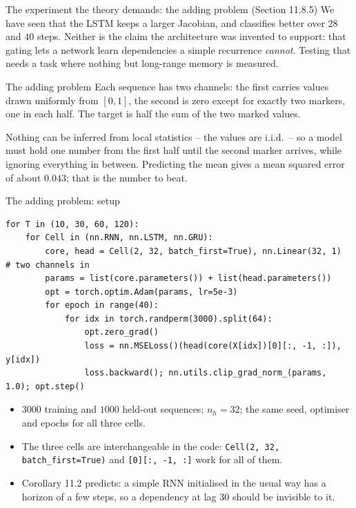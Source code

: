\documentclass[10pt,aspectratio=169]{beamer}
\begin{document}
\begin{frame}{The experiment the theory demands: the adding problem (Section 11.8.5)}
We have seen that the LSTM keeps a larger Jacobian, and classifies better
over $28$ and $40$ steps.  Neither is the claim the architecture was
invented to support: that gating lets a network learn dependencies a simple
recurrence \emph{cannot}.  Testing that needs a task where nothing but
long-range memory is measured.
\begin{block}{The adding problem}
Each sequence has two channels: the first carries values drawn uniformly
from $[0,1]$, the second is zero except for exactly two markers, one in
each half.  The target is half the sum of the two marked values.
\end{block}
Nothing can be inferred from local statistics -- the values are i.i.d.\ --
so a model must hold one number from the first half until the second marker
arrives, while ignoring everything in between.  Predicting the mean gives
a mean squared error of about $0.043$; that is the number to beat.
\end{frame}

\begin{frame}[fragile]{The adding problem: setup}
\begin{lstlisting}
for T in (10, 30, 60, 120):
    for Cell in (nn.RNN, nn.LSTM, nn.GRU):
        core, head = Cell(2, 32, batch_first=True), nn.Linear(32, 1)   # two channels in
        params = list(core.parameters()) + list(head.parameters())
        opt = torch.optim.Adam(params, lr=5e-3)
        for epoch in range(40):
            for idx in torch.randperm(3000).split(64):
                opt.zero_grad()
                loss = nn.MSELoss()(head(core(X[idx])[0][:, -1, :]), y[idx])
                loss.backward(); nn.utils.clip_grad_norm_(params, 1.0); opt.step()
\end{lstlisting}
\small
\begin{itemize}
  \item $3000$ training and $1000$ held-out sequences; $n_h=32$; the same
        seed, optimiser and epochs for all three cells.
  \item The three cells are interchangeable in the code: \texttt{Cell(2,
        32, batch\_first=True)} and \texttt{[0][:, -1, :]} work for all of
        them.
  \item Corollary 11.2 predicts: a simple RNN initialised in the usual way
        has a horizon of a few steps, so a dependency at lag $30$ should be
        invisible to it.
\end{itemize}
\end{frame}
\end{document}
